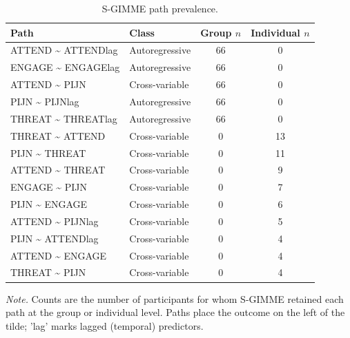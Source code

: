 \begin{table}[!htbp]
\raggedright
\caption{S-GIMME path prevalence.}
\label{tab:sup-sgimme}
\scriptsize
\begingroup
\setlength{\tabcolsep}{4pt}
\renewcommand{\arraystretch}{1.08}
\noindent
\begin{tabular*}{\textwidth}{@{\extracolsep{\fill}}llcc@{}}
\toprule
Path & Class & Group $n$ & Individual $n$ \\
\midrule
ATTEND \textasciitilde{} ATTENDlag & Autoregressive & 66 & 0 \\
ENGAGE \textasciitilde{} ENGAGElag & Autoregressive & 66 & 0 \\
ATTEND \textasciitilde{} PIJN & Cross-variable & 66 & 0 \\
PIJN \textasciitilde{} PIJNlag & Autoregressive & 66 & 0 \\
THREAT \textasciitilde{} THREATlag & Autoregressive & 66 & 0 \\
THREAT \textasciitilde{} ATTEND & Cross-variable & 0 & 13 \\
PIJN \textasciitilde{} THREAT & Cross-variable & 0 & 11 \\
ATTEND \textasciitilde{} THREAT & Cross-variable & 0 & 9 \\
ENGAGE \textasciitilde{} PIJN & Cross-variable & 0 & 7 \\
PIJN \textasciitilde{} ENGAGE & Cross-variable & 0 & 6 \\
ATTEND \textasciitilde{} PIJNlag & Cross-variable & 0 & 5 \\
PIJN \textasciitilde{} ATTENDlag & Cross-variable & 0 & 4 \\
ATTEND \textasciitilde{} ENGAGE & Cross-variable & 0 & 4 \\
THREAT \textasciitilde{} PIJN & Cross-variable & 0 & 4 \\
\bottomrule
\end{tabular*}
\par\vspace{3pt}\noindent\parbox{\textwidth}{\scriptsize\textit{Note.} Counts are the number of participants for whom S-GIMME retained each path at the group or individual level. Paths place the outcome on the left of the tilde; 'lag' marks lagged (temporal) predictors.}
\endgroup
\end{table}
